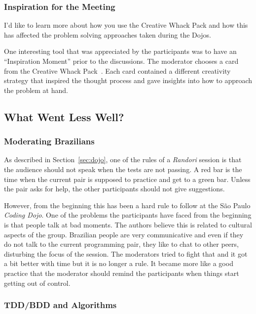 \subsubsection{Inspiration for the Meeting}

{\Large I'd like to learn more about how you use the Creative Whack
  Pack and how this has affected the problem solving approaches taken
  during the Dojos.}

One interesting tool that was appreciated by the participants was
to have an ``Inspiration Moment'' prior to the discussions. The moderator
chooses a card from the Creative Whack Pack~\cite{Creative}. Each
card contained a different creativity strategy that inspired the thought
process and gave insights into how to approach the problem at hand.

\subsection{What Went Less Well?}\label{ssub:less_well}

\subsubsection{Moderating Brazilians}

As described in Section~\ref{sec:dojo}, one of the rules of a
\emph{Randori} session is that the audience should not speak when
the tests are not passing. A red bar is the time when the current
pair is supposed to practice and get to a green bar. Unless the pair
asks for help, the other participants should not give suggestions.

However, from the beginning this has been a hard rule to follow at
the São Paulo \emph{Coding Dojo}. One of the problems the participants
have faced from the beginning is that people talk at bad moments. The authors
believe this is related to cultural aspects of the group. Brazilian people are
very communicative and even if they do not talk to the current programming
pair, they like to chat to other peers, disturbing the focus of the session.
The moderators tried to fight that and it got a bit better with time but it is no
longer a rule. It became more like a good practice that the moderator should
remind the participants when things start getting out of control.

\subsubsection{TDD/BDD and Algorithms}

